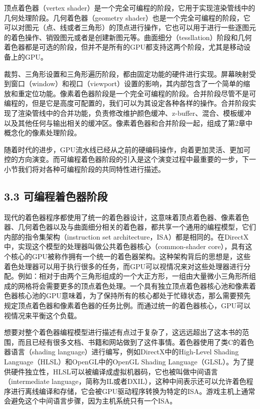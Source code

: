 \documentclass[
  paper=a4,
  ,captions=tableheading
]{scrartcl}
\begin{document}
顶点着色器（vertex
shader）是一个完全可编程的阶段，它用于实现渲染管线中的几何处理阶段。几何着色器（geometry
shader）也是一个完全可编程的阶段，它可以对图元（点、线或者三角形）的顶点进行操作，它也可以用于进行一些逐图元的着色操作、销毁图元或者是创建新图元等。曲面细分（tessllation）阶段和几何着色器都是可选的阶段，但并不是所有的GPU都支持这两个阶段，尤其是移动设备上的GPU。

裁剪、三角形设置和三角形遍历阶段，都由固定功能的硬件进行实现。屏幕映射受到窗口（window）和视口（viewport）设置的影响，其内部包含了一个简单的缩放和重定位功能。像素着色器阶段是一个完全可编程的阶段。合并阶段尽管不是可编程的，但是它是高度可配置的，我们可以为其设定各种各样的操作。合并阶段实现了渲染管线中的合并功能，负责修改维护颜色缓冲、z-buffer、混合、模板缓冲以及其他任何与输出相关的缓冲区。像素着色器和合并阶段一起，组成了第2章中概念化的像素处理阶段。

随着时代的进步，GPU流水线已经从之前的硬编码操作，向着更加灵活、更加可控的方向演变。而可编程着色器阶段的引入是这个演变过程中最重要的一步，下一小节我们将对各种可编程阶段的共同特性进行描述。

\subsection{3.3
可编程着色器阶段}\label{ux53efux7f16ux7a0bux7740ux8272ux5668ux9636ux6bb5}

现代的着色器程序都使用了统一的着色器设计，这意味着顶点着色器、像素着色器、几何着色器以及与曲面细分相关的着色器，都共享一个通用的编程模型，它们内部的指令集架构（instruction
set
architecture，ISA）都是相同的。在DirectX中，实现这个模型的处理器叫做公共着色器核心（common-shader
core），具有这个核心的GPU被称作拥有一个统一的着色器架构。这种架构背后的思想是，这些着色处理器可以用于执行很多的任务，而GPU可以视情况来对这些处理器进行分配。例如：相对于由两个三角形组成的一个大正方形，一组由大量微小三角形所组成的网格将会需要更多的顶点着色处理。一个具有独立顶点着色器核心池和像素着色器核心池的GPU意味着，为了保持所有的核心都处于忙碌状态，那么需要预先规定顶点着色器和像素着色器的任务比例。而通过统一的着色器核心，GPU可以视情况来平衡这个负载。

想要对整个着色器编程模型进行描述有点过于复杂了，这远远超出了这本书的范围，而且已经有很多文档、书籍和网站做到了这件事情。着色器使用了类C的着色器语言（shading
language）进行编写，例如DirectX中的High-Level Shading
Language（HLSL）和OpenGL中的OpenGL Shading
Language（GLSL）。为了提供硬件独立性，HLSL可以被编译成虚拟机器码，它也被叫做中间语言（intermediate
language，简称为IL或者DXIL），这种中间表示还可以允许着色程序进行离线编译和存储，它会被GPU驱动程序转换为特定的ISA。游戏主机上通常会避免这个中间语言步骤，因为主机系统只有一个ISA。
\end{document}
